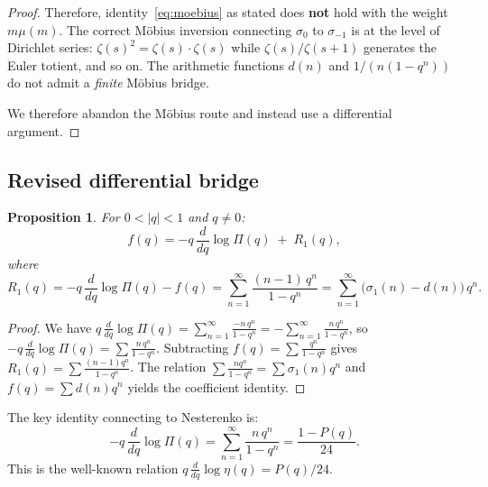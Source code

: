 \documentclass[12pt]{amsart}
\newtheorem{proposition}[theorem]{Proposition}
\theoremstyle{definition}
\theoremstyle{remark}
\begin{document}
\begin{proof}
Therefore, identity~\eqref{eq:moebius} as stated does \textbf{not}
hold with the weight $m\mu(m)$. The correct M\"obius inversion
connecting $\sigma_0$ to $\sigma_{-1}$ is at the level of Dirichlet
series: $\zeta(s)^2=\zeta(s)\cdot\zeta(s)$ while
$\zeta(s)/\zeta(s+1)$ generates the Euler totient, and so on. The
arithmetic functions $d(n)$ and $1/(n(1-q^n))$ do not admit a
\emph{finite} M\"obius bridge.

We therefore abandon the M\"obius route and instead use a differential
argument.
\end{proof}

\subsection{Revised differential bridge}\label{ss:revised}

\begin{proposition}\label{prop:bridge}
For $0<|q|<1$ and $q\ne 0$:
\begin{equation}\label{eq:bridge2}
  f(q) = -q\,\frac{d}{dq}\log\Pi(q)
         \;+\; R_1(q),
\end{equation}
where
\[
  R_1(q) = -q\,\frac{d}{dq}\log\Pi(q) - f(q)
         = \sum_{n=1}^{\infty}\frac{(n-1)\,q^n}{1-q^n}
         = \sum_{n=1}^{\infty}\bigl(\sigma_1(n)-d(n)\bigr)\,q^n.
\]
\end{proposition}
\begin{proof}
We have
$q\,\frac{d}{dq}\log\Pi(q)
 =\sum_{n=1}^{\infty}\frac{-n\,q^n}{1-q^n}
 =-\sum_{n=1}^{\infty}\frac{n\,q^n}{1-q^n}$,
so $-q\,\frac{d}{dq}\log\Pi(q)=\sum\frac{n\,q^n}{1-q^n}$.
Subtracting $f(q)=\sum\frac{q^n}{1-q^n}$ gives
$R_1(q)=\sum\frac{(n-1)q^n}{1-q^n}$. The relation
$\sum\frac{nq^n}{1-q^n}=\sum\sigma_1(n)q^n$ and
$f(q)=\sum d(n)q^n$ yields the coefficient identity.
\end{proof}

The key identity connecting to Nesterenko is:
\begin{equation}\label{eq:Pconn}
  -q\,\frac{d}{dq}\log\Pi(q)
  = \sum_{n=1}^{\infty}\frac{n\,q^n}{1-q^n}
  = \frac{1-P(q)}{24}.
\end{equation}
This is the well-known relation $q\,\frac{d}{dq}\log\eta(q)=P(q)/24$.
\end{document}
